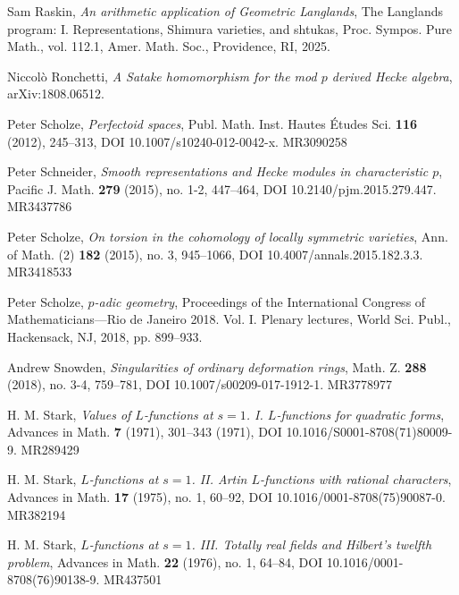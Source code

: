 \begin{refs}
\item[{[Ras25]}] Sam Raskin, \emph{An arithmetic application of Geometric Langlands}, The Langlands program: I. Representations, Shimura varieties, and shtukas, Proc. Sympos. Pure Math., vol. 112.1, Amer. Math. Soc., Providence, RI, 2025.
\item[{[Ron]}] Niccol\`o Ronchetti, \emph{A Satake homomorphism for the mod $p$ derived Hecke algebra}, arXiv:1808.06512.
\item[{[Sch12]}] Peter Scholze, \emph{Perfectoid spaces}, Publ. Math. Inst. Hautes \'Etudes Sci. \textbf{116} (2012), 245--313, DOI 10.1007/s10240-012-0042-x. MR3090258
\item[{[Sch15a]}] Peter Schneider, \emph{Smooth representations and Hecke modules in characteristic $p$}, Pacific J. Math. \textbf{279} (2015), no. 1-2, 447--464, DOI 10.2140/pjm.2015.279.447. MR3437786
\item[{[Sch15b]}] Peter Scholze, \emph{On torsion in the cohomology of locally symmetric varieties}, Ann. of Math. (2) \textbf{182} (2015), no. 3, 945--1066, DOI 10.4007/annals.2015.182.3.3. MR3418533
\item[{[Sch18]}] Peter Scholze, \emph{$p$-adic geometry}, Proceedings of the International Congress of Mathematicians---Rio de Janeiro 2018. Vol. I. Plenary lectures, World Sci. Publ., Hackensack, NJ, 2018, pp. 899--933.
\item[{[Sno18]}] Andrew Snowden, \emph{Singularities of ordinary deformation rings}, Math. Z. \textbf{288} (2018), no. 3-4, 759--781, DOI 10.1007/s00209-017-1912-1. MR3778977
\item[{[Sta71]}] H. M. Stark, \emph{Values of $L$-functions at $s=1$. I. $L$-functions for quadratic forms}, Advances in Math. \textbf{7} (1971), 301--343 (1971), DOI 10.1016/S0001-8708(71)80009-9. MR289429
\item[{[Sta75]}] H. M. Stark, \emph{$L$-functions at $s=1$. II. Artin $L$-functions with rational characters}, Advances in Math. \textbf{17} (1975), no. 1, 60--92, DOI 10.1016/0001-8708(75)90087-0. MR382194
\item[{[Sta76]}] H. M. Stark, \emph{$L$-functions at $s=1$. III. Totally real fields and Hilbert's twelfth problem}, Advances in Math. \textbf{22} (1976), no. 1, 64--84, DOI 10.1016/0001-8708(76)90138-9. MR437501


\end{refs}
